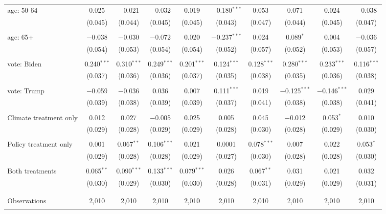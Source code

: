 \begin{tabular}{@{\extracolsep{5pt}}lccccccccc}
 age: 50-64 & 0.025 & $-$0.021 & $-$0.032 & 0.019 & $-$0.180$^{***}$ & 0.053 & 0.071 & 0.024 & $-$0.038 \\ 
  & (0.045) & (0.044) & (0.045) & (0.045) & (0.043) & (0.047) & (0.044) & (0.045) & (0.047) \\ 
  & & & & & & & & & \\ 
 age: 65+ & $-$0.038 & $-$0.030 & $-$0.072 & 0.020 & $-$0.237$^{***}$ & 0.024 & 0.089$^{*}$ & 0.004 & $-$0.036 \\ 
  & (0.054) & (0.053) & (0.054) & (0.054) & (0.052) & (0.057) & (0.052) & (0.053) & (0.057) \\ 
  & & & & & & & & & \\ 
 vote: Biden & 0.240$^{***}$ & 0.310$^{***}$ & 0.249$^{***}$ & 0.201$^{***}$ & 0.124$^{***}$ & 0.128$^{***}$ & 0.280$^{***}$ & 0.233$^{***}$ & 0.116$^{***}$ \\ 
  & (0.037) & (0.036) & (0.036) & (0.037) & (0.035) & (0.038) & (0.035) & (0.036) & (0.038) \\ 
  & & & & & & & & & \\ 
 vote: Trump & $-$0.059 & $-$0.036 & 0.036 & 0.007 & 0.111$^{***}$ & 0.019 & $-$0.125$^{***}$ & $-$0.146$^{***}$ & 0.029 \\ 
  & (0.039) & (0.038) & (0.039) & (0.039) & (0.037) & (0.041) & (0.038) & (0.038) & (0.041) \\ 
  & & & & & & & & & \\ 
 Climate treatment only & 0.012 & 0.027 & $-$0.005 & 0.025 & 0.005 & 0.045 & $-$0.012 & 0.053$^{*}$ & 0.010 \\ 
  & (0.029) & (0.028) & (0.029) & (0.029) & (0.028) & (0.030) & (0.028) & (0.029) & (0.030) \\ 
  & & & & & & & & & \\ 
 Policy treatment only & 0.001 & 0.067$^{**}$ & 0.106$^{***}$ & 0.021 & 0.0001 & 0.078$^{***}$ & 0.007 & 0.022 & 0.053$^{*}$ \\ 
  & (0.029) & (0.028) & (0.028) & (0.029) & (0.027) & (0.030) & (0.028) & (0.028) & (0.030) \\ 
  & & & & & & & & & \\ 
 Both treatments & 0.065$^{**}$ & 0.090$^{***}$ & 0.133$^{***}$ & 0.079$^{***}$ & 0.026 & 0.067$^{**}$ & 0.031 & 0.021 & 0.032 \\ 
  & (0.030) & (0.029) & (0.030) & (0.030) & (0.028) & (0.031) & (0.029) & (0.029) & (0.031) \\ 
  & & & & & & & & & \\ 
\hline \\[-1.8ex] 

Observations & 2,010 & 2,010 & 2,010 & 2,010 & 2,010 & 2,010 & 2,010 & 2,010 & 2,010 \\ 
\hline 
\hline \\[-1.8ex] 
\end{tabular} 
